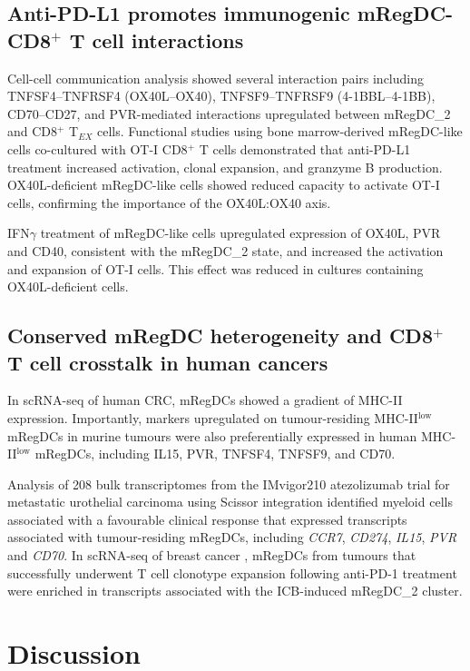 \documentclass[11pt]{article}
\begin{document}
\subsection{Anti-PD-L1 promotes immunogenic mRegDC-CD8$^+$ T cell interactions}

Cell-cell communication analysis showed several interaction pairs including TNFSF4--TNFRSF4 (OX40L--OX40), TNFSF9--TNFRSF9 (4-1BBL--4-1BB), CD70--CD27, and PVR-mediated interactions upregulated between mRegDC\_2 and CD8$^+$ T$_{EX}$ cells. Functional studies using bone marrow-derived mRegDC-like cells co-cultured with OT-I CD8$^+$ T cells demonstrated that anti-PD-L1 treatment increased activation, clonal expansion, and granzyme B production. OX40L-deficient mRegDC-like cells showed reduced capacity to activate OT-I cells, confirming the importance of the OX40L:OX40 axis.

IFN$\gamma$ treatment of mRegDC-like cells upregulated expression of OX40L, PVR and CD40, consistent with the mRegDC\_2 state, and increased the activation and expansion of OT-I cells. This effect was reduced in cultures containing OX40L-deficient cells.

\subsection{Conserved mRegDC heterogeneity and CD8$^+$ T cell crosstalk in human cancers}

In scRNA-seq of human CRC, mRegDCs showed a gradient of MHC-II expression. Importantly, markers upregulated on tumour-residing MHC-II$^{\text{low}}$ mRegDCs in murine tumours were also preferentially expressed in human MHC-II$^{\text{low}}$ mRegDCs, including IL15, PVR, TNFSF4, TNFSF9, and CD70.

Analysis of 208 bulk transcriptomes from the IMvigor210 atezolizumab trial for metastatic urothelial carcinoma \citep{mariathasan2018} using Scissor integration \citep{sun2021} identified myeloid cells associated with a favourable clinical response that expressed transcripts associated with tumour-residing mRegDCs, including \textit{CCR7}, \textit{CD274}, \textit{IL15}, \textit{PVR} and \textit{CD70}. In scRNA-seq of breast cancer \citep{bassez2021}, mRegDCs from tumours that successfully underwent T cell clonotype expansion following anti-PD-1 treatment were enriched in transcripts associated with the ICB-induced mRegDC\_2 cluster.

\section{Discussion}
\end{document}
